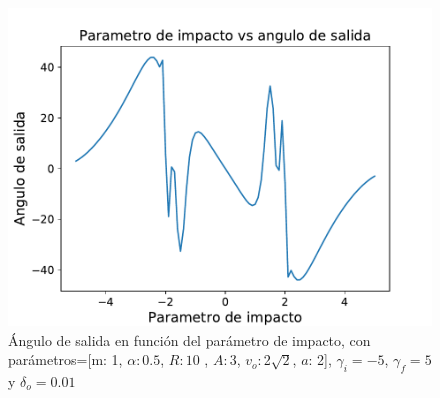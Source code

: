 \documentclass[11pt,letterpaper,twocolumn]{article}
\begin{document}
\begin{figure}[H]
\centering 
\includegraphics[scale=0.55]{g12.pdf}
\caption{Ángulo de salida en función del parámetro de impacto, con parámetros=[m: 1, $\alpha: 0$.$5$, $R: 10$ , $A: 3$, $ v_{o}: $2$\sqrt{2}$, $a$: 2], $\gamma_{i}=-5$, $\gamma_{f}=5$ y $\delta_{o}=0.01$}
\label{f10}
\end{figure}
 
\end{document}
